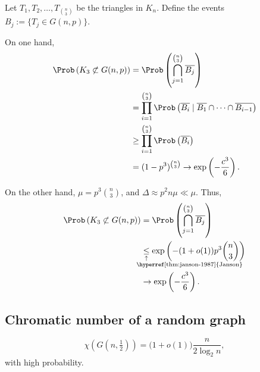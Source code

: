 \begin{dem}
	Let $T_1, T_2, \dots, T_{\binom{n}{3}}$ be the triangles in $K_n$. Define the events $B_j := \{T_j \in G(n, p)\}$.

	On one hand,
	\begin{align*}
		\Prob\left(K_3 \not\subset G(n, p)\right)
			&= \Prob\left(\bigcap_{j=1}^{\binom{n}{3}} \overline{B_j}\right) \\
			&= \prod_{i=1}^{\binom{n}{3}} \Prob\left( \overline{B_i} \mid \overline{B_1} \cap \cdots \cap \overline{B_{i-1}}\right) \\
			&\ge \prod_{i=1}^{\binom{n}{3}} \Prob\left(\overline{B_i}\right) \\
			&= (1 - p^3)^{\binom{n}{3}} \to \exp\left(-\frac{c^3}{6}\right).
	\end{align*}

	On the other hand, $\mu = p^3\binom{n}{3}$, and $\Delta \approx p^2 n \mu \ll \mu$. Thus,
	\begin{align*}
		\Prob\left(K_3 \not\subset G(n, p)\right)
			&= \Prob\left(\bigcap_{j=1}^{\binom{n}{3}} \overline{B_j}\right) \\
			&\signexpl{\le}{\hyperref[thm:janson-1987]{Janson}}{-1.5em} \exp\left(-(1+o(1))p^3\binom{n}{3}\right)\\
			&\to \exp\left(-\frac{c^3}{6}\right).
	\end{align*}
\end{dem}

\subsection{Chromatic number of a random graph}

\begin{thm}[Bollobás, 1980s]\label{thm:bollobas-1980}
	\[\chi\left(G\left(n, \tfrac{1}{2}\right)\right) = \big(1 + o(1)\big) \frac{n}{2\log_2{n}},\]
	with high probability.
\end{thm}

